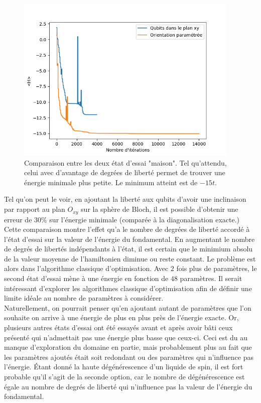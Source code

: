 \documentclass{subfiles}[../main.tex]
\begin{document}
\begin{figure}[H]
    \begin{center}
        \includegraphics[width=0.95\textwidth]{../figs/convergence_upgrade.png}
    \end{center}
    \caption{Comparaison entre les deux état d'essai "maison". Tel qu'attendu,
    celui avec d'avantage de degrées de liberté permet de trouver une énergie
    minimale plus petite. Le minimum atteint est de $-15t$.}
    \label{fig:}
\end{figure}
    Tel qu'on peut le voir, en ajoutant la liberté aux qubits d'avoir une inclinaison
    par rapport au plan $O_{xy}$ sur la sphère de Bloch, il est possible d'obtenir
    une erreur de $30\%$ sur l'énergie minimale (comparée à la diagonalisation
    exacte.) Cette comparaison montre l'effet qu'a le nombre de degrées de liberté
    accordé à l'état d'essai sur la valeur de l'énergie du fondamental. En
    augmentant le nombre de degrés de libertés indépendants à l'état, il est
    certain que le minimium absolu de la valeur moyenne de l'hamiltonien diminue
    ou reste constant. Le problème est alors dans l'algorithme classique d'optimisation.
    Avec $2$ fois plus de paramètres, le second état d'essai mène à une énergie
    en fonction de $48$ paramètres. Il serait intéressant d'explorer les
    algorithmes classique d'optimisation afin de définir une limite idéale au
    nombre de paramètres à considérer.\\
    Naturellement, on pourrait penser qu'en ajoutant autant de paramètres que l'on
    souhaite on arrive à une énergie de plus en plus près de l'énergie exacte.
    Or, plusieurs autres états d'essai ont été essayés avant et après avoir bâti
    ceux présenté qui n'admettait pas une énergie plus basse que ceux-ci. Ceci
    est du au manque d'exploration du domaine en partie, mais probablement plus
    au fait que les paramètres ajoutés était soit redondant ou des paramètres qui
    n'influence pas l'énergie. Étant donné la haute dégénérescence d'un liquide
    de spin, il est fort probable qu'il s'agit de la seconde option, car le
    nombre de dégénérescence est égale au nombre de degrés de liberté qui
    n'influence pas la valeur de l'énergie du fondamental.
\end{document}
